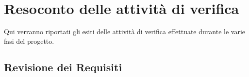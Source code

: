 
\section{Resoconto delle attività di verifica}
\label{resoconto_attivita}
Qui verranno riportati gli esiti delle attività di verifica effettuate durante le varie fasi del progetto.

\subsection{Revisione dei Requisiti}
\label{RR}

